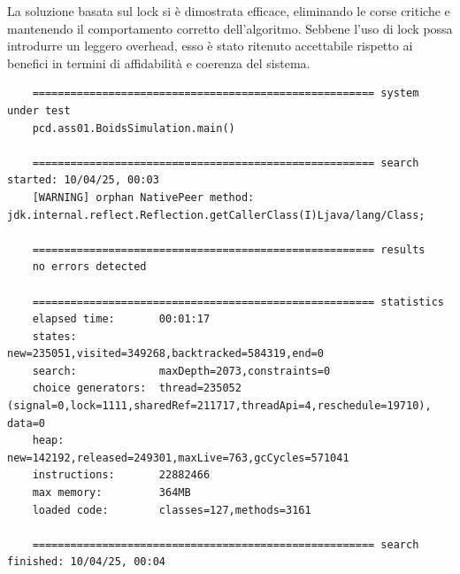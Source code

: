 \documentclass[a4paper,12pt]{report}
\begin{document}
La soluzione basata sul lock si è dimostrata efficace, eliminando le corse critiche e mantenendo il comportamento corretto dell'algoritmo. Sebbene l'uso di lock possa introdurre un leggero overhead, esso è stato ritenuto accettabile rispetto ai benefici in termini di affidabilità e coerenza del sistema.

\begin{verbatim}
    ====================================================== system under test
    pcd.ass01.BoidsSimulation.main()

    ====================================================== search started: 10/04/25, 00:03
    [WARNING] orphan NativePeer method: jdk.internal.reflect.Reflection.getCallerClass(I)Ljava/lang/Class;

    ====================================================== results
    no errors detected

    ====================================================== statistics
    elapsed time:       00:01:17
    states:             new=235051,visited=349268,backtracked=584319,end=0
    search:             maxDepth=2073,constraints=0
    choice generators:  thread=235052 (signal=0,lock=1111,sharedRef=211717,threadApi=4,reschedule=19710), data=0
    heap:               new=142192,released=249301,maxLive=763,gcCycles=571041
    instructions:       22882466
    max memory:         364MB
    loaded code:        classes=127,methods=3161

    ====================================================== search finished: 10/04/25, 00:04
\end{verbatim}
\end{document}
